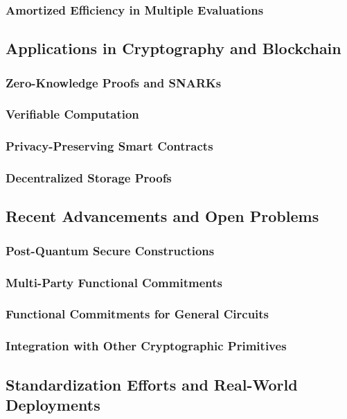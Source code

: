 \documentclass{iacrtrans}
\begin{document}
\subsubsection{Amortized Efficiency in Multiple Evaluations}

\subsection{Applications in Cryptography and Blockchain}
\subsubsection{Zero-Knowledge Proofs and SNARKs}
\subsubsection{Verifiable Computation}
\subsubsection{Privacy-Preserving Smart Contracts}
\subsubsection{Decentralized Storage Proofs}

\subsection{Recent Advancements and Open Problems}
\subsubsection{Post-Quantum Secure Constructions}
\subsubsection{Multi-Party Functional Commitments}
\subsubsection{Functional Commitments for General Circuits}
\subsubsection{Integration with Other Cryptographic Primitives}

\subsection{Standardization Efforts and Real-World Deployments}
\end{document}
